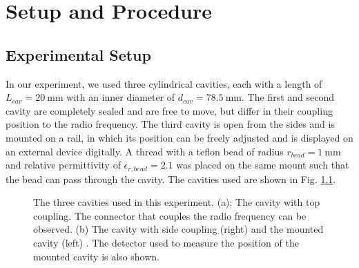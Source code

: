 \documentclass[a4paper]{report}
\numberwithin{equation}{section}
\begin{document}
\chapter{Setup and Procedure}

\section{Experimental Setup}

In our experiment, we used three cylindrical cavities, each with a length of
$L_{cav} = \SI{20}{\milli\metre}$ with an inner diameter of $d_{cav} =
\SI{78.5}{\milli\metre}$. The first and second cavity are completely sealed and
are free to move, but differ in their coupling position to the radio frequency.
The third cavity is open from the sides and is mounted on a rail, in which its
position can be freely adjusted and is displayed on an external device
digitally. A thread with a teflon bead of radius $r_{bead} = \SI{1}{\milli\metre}$ and
relative permittivity of $\epsilon_{r, bead} = 2.1$ was placed on the same
mount such that the bead can pass through the cavity. The cavities used are shown in Fig.
\ref{fig:cavities_equipment}.

\begin{figure}[hbt!]
	\centering
	\quad

	\caption{The three cavities used in this experiment. (a): The cavity with
	top coupling. The connector that couples the radio frequency can be
	observed. (b) The cavity with side coupling (right) and the mounted cavity
	(left) \cite*{Switka22}. The detector used to measure the position of the
	mounted cavity is also shown.}
	\label{fig:cavities_equipment}
\end{figure}
\end{document}
